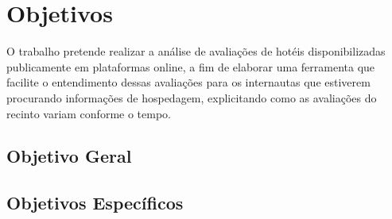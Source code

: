 \chapter{Objetivos}\label{cap:objetivos}

O trabalho pretende realizar a análise de avaliações de hotéis disponibilizadas publicamente em plataformas online, a fim de elaborar uma ferramenta que facilite o entendimento dessas avaliações para os internautas que estiverem procurando informações de hospedagem, explicitando como as avaliações do recinto variam conforme o tempo.

\section{Objetivo Geral}


\section{Objetivos Específicos}


